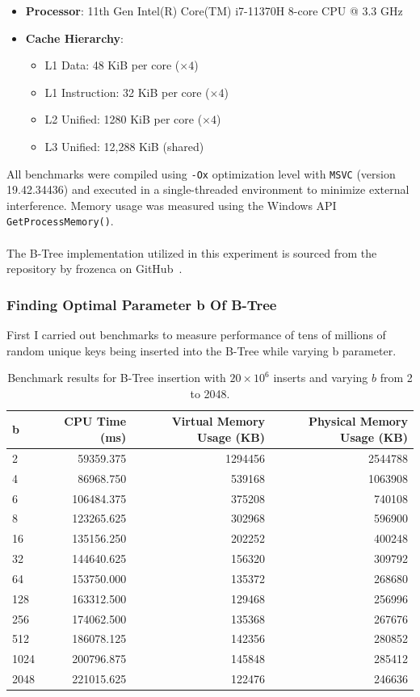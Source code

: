 \documentclass[12pt]{article}
\begin{document}
\begin{itemize}
	\item \textbf{Processor}: 11th Gen Intel(R) Core(TM) i7-11370H 8-core CPU @ 3.3 GHz
	\item \textbf{Cache Hierarchy}:
	\begin{itemize}
		\item L1 Data: 48 KiB per core (\(\times 4\))
		\item L1 Instruction: 32 KiB per core (\(\times 4\))
		\item L2 Unified: 1280 KiB per core (\(\times 4\))
		\item L3 Unified: 12,288 KiB (shared)
	\end{itemize}
\end{itemize}

All benchmarks were compiled using \texttt{-Ox} optimization level with \texttt{MSVC} (version 19.42.34436) and executed in a single-threaded environment to minimize external interference. Memory usage was measured using the Windows API \texttt{GetProcessMemory()}.\\
\\
The B-Tree implementation utilized in this experiment is sourced from the repository by frozenca
on GitHub~\cite{btree_github}.

\subsubsection*{Finding Optimal Parameter b Of B-Tree}
First I carried out benchmarks to measure performance of tens of millions of random unique keys being inserted into the B-Tree while varying b parameter. 
\begin{table}[h]
	\centering
	\small
	\begin{tabular}{lrrr}
		\hline
		\textbf{b} & \textbf{CPU Time (ms)} & \textbf{Virtual Memory Usage (KB)} & \textbf{Physical Memory Usage (KB)} \\
		\hline
		2    & 59359.375  & 1294456  & 2544788 \\
		4    & 86968.750  & 539168   & 1063908 \\
		6    & 106484.375 & 375208   & 740108  \\
		8    & 123265.625 & 302968   & 596900  \\
		16   & 135156.250 & 202252   & 400248  \\
		32   & 144640.625 & 156320   & 309792  \\
		64   & 153750.000 & 135372   & 268680  \\
		128  & 163312.500 & 129468   & 256996  \\
		256  & 174062.500 & 135368   & 267676  \\
		512  & 186078.125 & 142356   & 280852  \\
		1024 & 200796.875 & 145848   & 285412  \\
		2048 & 221015.625 & 122476   & 246636  \\
		\hline
	\end{tabular}
	\caption{Benchmark results for B-Tree insertion with $20 \times 10^6$ inserts and varying $b$ from 2 to 2048.}
\end{table}
\end{document}
